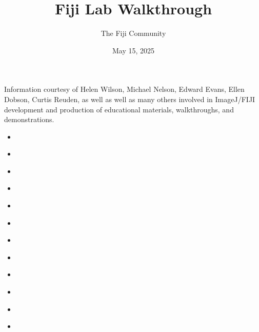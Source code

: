 \documentclass[letterpaper,10pt,english]{jupyterBook}
\title{Fiji Lab Walkthrough}
\date{May 15, 2025}
\author{The Fiji Community}
\begin{document}
\pagestyle{empty}
\sphinxmaketitle
\pagestyle{plain}
\sphinxtableofcontents
\pagestyle{normal}
\label{\detokenize{intro::doc}}


\sphinxAtStartPar
Information courtesy of Helen Wilson, Michael Nelson, Edward Evans, Ellen Dobson, Curtis Reuden,
as well as well as many others involved in ImageJ/FIJI development and production of
educational materials, walkthroughs, and demonstrations.
\begin{itemize}
\item {} 
\sphinxAtStartPar
{\hyperref[\detokenize{installation::doc}]{}}

\item {} 
\sphinxAtStartPar
{\hyperref[\detokenize{keyboard-shortcuts::doc}]{}}

\item {} 
\sphinxAtStartPar
{\hyperref[\detokenize{basics::doc}]{}}

\item {} 
\sphinxAtStartPar
{\hyperref[\detokenize{basic-segmentation::doc}]{}}

\item {} 
\sphinxAtStartPar
{\hyperref[\detokenize{basic-registration::doc}]{}}

\item {} 
\sphinxAtStartPar
{\hyperref[\detokenize{basic-scripting::doc}]{}}

\item {} 
\sphinxAtStartPar
{\hyperref[\detokenize{deconvolution::doc}]{}}

\item {} 
\sphinxAtStartPar
{\hyperref[\detokenize{background-subtraction::doc}]{}}

\item {} 
\sphinxAtStartPar
{\hyperref[\detokenize{trackmate::doc}]{}}

\item {} 
\sphinxAtStartPar
{\hyperref[\detokenize{stardist::doc}]{}}

\item {} 
\sphinxAtStartPar
{\hyperref[\detokenize{labkit::doc}]{}}

\item {} 
\sphinxAtStartPar
{\hyperref[\detokenize{extra-resources::doc}]{}}

\end{itemize}
\end{document}
